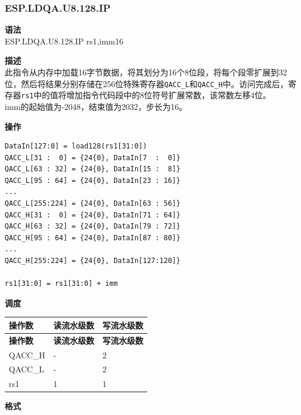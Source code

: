 \newpage

\newpage
\subsubsection{ESP.LDQA.U8.128.IP}\label{instruction:ESPLDQAU8128IP}
\textbf{语法}\\
ESP.LDQA.U8.128.IP rs1,imm16

\textbf{描述}\\
此指令从内存中加载16字节数据，将其划分为16个8位段，将每个段零扩展到32位，然后将结果分别存储在256位特殊寄存器\lstinline{QACC_L}和\lstinline{QACC_H}中。访问完成后，寄存器\lstinline{rs1}中的值将增加指令代码段中的8位符号扩展常数，该常数左移4位。\\

imm的起始值为-2048，结束值为2032，步长为16。

\textbf{操作}
\begin{lstlisting}
DataIn[127:0] = load128(rs1[31:0])
QACC_L[31 :  0] = {24{0}, DataIn[7  :  0]}
QACC_L[63 : 32] = {24{0}, DataIn[15 :  8]}
QACC_L[95 : 64] = {24{0}, DataIn[23 : 16]}
...
QACC_L[255:224] = {24{0}, DataIn[63 : 56]}
QACC_H[31 :  0] = {24{0}, DataIn[71 : 64]}
QACC_H[63 : 32] = {24{0}, DataIn[79 : 72]}
QACC_H[95 : 64] = {24{0}, DataIn[87 : 80]}
...
QACC_H[255:224] = {24{0}, DataIn[127:120]}

rs1[31:0] = rs1[31:0] + imm
\end{lstlisting}

\textbf{调度}\\
\begin{longtable}[c]{|l|l|l|}
    \hline
    \rowcolor{lightgray}
    \textbf{操作数} & \textbf{读流水级数} & \textbf{写流水级数} \\\hline
    \endfirsthead
    \hline
    \rowcolor{lightgray}
     \textbf{操作数} & \textbf{读流水级数} & \textbf{写流水级数} \\\hline
    \endhead
    \hline
    \endfoot

  QACC\_H & - & 2 \\\hline
    QACC\_L & - & 2 \\\hline
  rs1 & 1 & 1

\end{longtable}

\textbf{格式}\\


